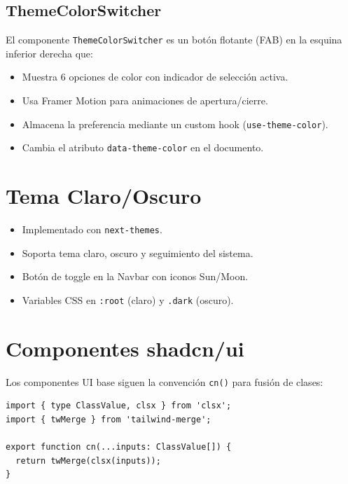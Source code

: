 \subsection{ThemeColorSwitcher}

El componente \texttt{ThemeColorSwitcher} es un bot\'on flotante (FAB) en
la esquina inferior derecha que:

\begin{itemize}[leftmargin=*]
    \item Muestra 6 opciones de color con indicador de selecci\'on activa.
    \item Usa Framer Motion para animaciones de apertura/cierre.
    \item Almacena la preferencia mediante un custom hook
          (\texttt{use-theme-color}).
    \item Cambia el atributo \texttt{data-theme-color} en el documento.
\end{itemize}

\section{Tema Claro/Oscuro}

\begin{itemize}[leftmargin=*]
    \item Implementado con \texttt{next-themes}.
    \item Soporta tema claro, oscuro y seguimiento del sistema.
    \item Bot\'on de toggle en la Navbar con iconos Sun/Moon.
    \item Variables CSS en \texttt{:root} (claro) y \texttt{.dark} (oscuro).
\end{itemize}

\section{Componentes shadcn/ui}

Los componentes UI base siguen la convenci\'on \texttt{cn()} para fusi\'on
de clases:

\begin{lstlisting}[style=typescript, caption=Funcion cn() para fusion de clases]
import { type ClassValue, clsx } from 'clsx';
import { twMerge } from 'tailwind-merge';

export function cn(...inputs: ClassValue[]) {
  return twMerge(clsx(inputs));
}
\end{lstlisting}

